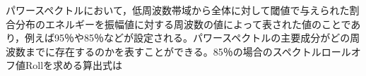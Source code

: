 パワースペクトルにおいて，低周波数帯域から全体に対して閾値で与えられた割合分布のエネルギーを振幅値に対する周波数の値によって表された値のことであり，例えば95％や85％などが設定される。パワースペクトルの主要成分がどの周波数までに存在するのかを表すことができる。85％の場合のスペクトルロールオフ値Rollを求める算出式は